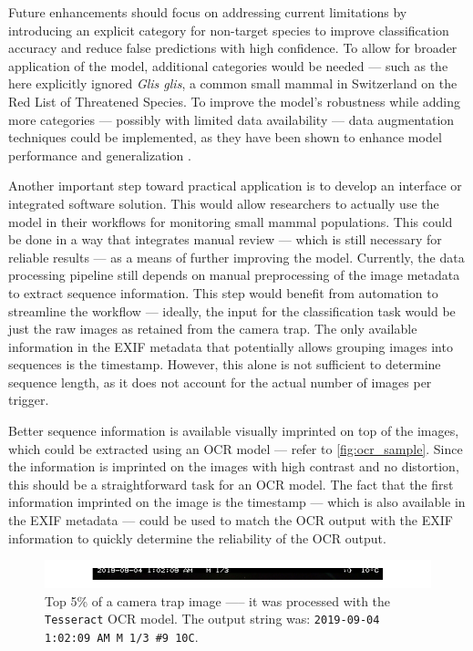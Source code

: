Future enhancements should focus on addressing current limitations by introducing an explicit category for non-target species to improve classification accuracy and reduce false predictions with high confidence.
To allow for broader application of the model, additional categories would be needed --- such as the here explicitly ignored \textit{Glis glis}, a common small mammal in Switzerland on the \textcite{iucnIUCNRedList2025} Red List of Threatened Species.
To improve the model's robustness while adding more categories --- possibly with limited data availability --- data augmentation techniques could be implemented, as they have been shown to enhance model performance and generalization \autocite{shortenSurveyImageData2019}.

Another important step toward practical application is to develop an interface or integrated software solution.
This would allow researchers to actually use the model in their workflows for monitoring small mammal populations.
This could be done in a way that integrates manual review --- which is still necessary for reliable results --- as a means of further improving the model.
Currently, the data processing pipeline still depends on manual preprocessing of the image metadata to extract sequence information.
This step would benefit from automation to streamline the workflow --- ideally, the input for the classification task would be just the raw images as retained from the camera trap.
The only available information in the \ac{EXIF} metadata that potentially allows grouping images into sequences is the timestamp.
However, this alone is not sufficient to determine sequence length, as it does not account for the actual number of images per trigger.

Better sequence information is available visually imprinted on top of the images, which could be extracted using an \ac{OCR} model --- refer to \autoref{fig:ocr_sample}.
Since the information is imprinted on the images with high contrast and no distortion, this should be a straightforward task for an \ac{OCR} model.
The fact that the first information imprinted on the image is the timestamp — which is also available in the \ac{EXIF} metadata --- could be used to match the \ac{OCR} output with the \ac{EXIF} information to quickly determine the reliability of the \ac{OCR} output.

\begin{figure}[ht]
\centering
\includegraphics{figures/ocr_example.pdf}
\caption{Top 5\% of a camera trap image —-- it was processed with the \texttt{Tesseract} \acs{OCR} model. The output string was: \texttt{2019-09-04 1:02:09 AM M 1/3 \#9 10\textdegree C}.}
\label{fig:ocr_sample}
\end{figure}
